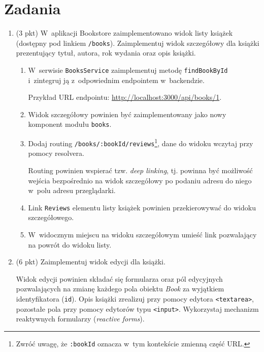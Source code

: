 \documentclass[12pt]{article}
\begin{document}
    \section*{Zadania}
    \begin{enumerate}

		\item\label{book-details}
			(3 pkt) W~aplikacji Bookstore zaimplementowano widok listy książek (dostępny pod linkiem \texttt{/books}).
			Zaimplementuj widok szczegółowy dla książki prezentujący tytuł, autora, rok wydania oraz opis książki.

			\begin{enumerate}
				\item W~serwisie \texttt{BooksService} zaimplementuj metodę \texttt{findBookById} i~zintegruj ją z~odpowiednim endpointem w~backendzie.

				Przykład URL endpointu: \href{http://localhost:3000/api/books/1}{http://localhost:3000/api/books/1}.

				\item Widok szczegółowy powinien być zaimplementowany jako nowy komponent modułu \texttt{books}.

				\item Dodaj routing \texttt{/books/:bookId/reviews}\footnote{Zwróć uwagę, że \texttt{:bookId} oznacza w~tym kontekście zmienną część URL.}, dane do widoku wczytaj przy pomocy resolvera.

				Routing powinien wspierać tzw. \emph{deep linking}, tj. powinna być możliwość wejścia bezpośrednio na widok szczegółowy po podaniu adresu do niego w~polu adresu przeglądarki.

				\item Link \texttt{Reviews} elementu listy książek powinien przekierowywać do widoku szczegółowego.

				\item W~widocznym miejscu na widoku szczegółowym umieść link pozwalający na powrót do widoku listy.
			\end{enumerate}

		\item
			(6 pkt) Zaimplementuj widok edycji dla książki.

			Widok edycji powinien składać się formularza oraz pól edycyjnych pozwalających na zmianę każdego pola obiektu \emph{Book} za wyjątkiem identyfikatora (\texttt{id}).
			Opis książki zrealizuj przy pomocy edytora \texttt{<textarea>}, pozostałe pola przy pomocy edytorów typu \texttt{<input>}.
			Wykorzystaj mechanizm reaktywnych formularzy (\emph{reactive forms}).


\end{enumerate}
\end{document}
